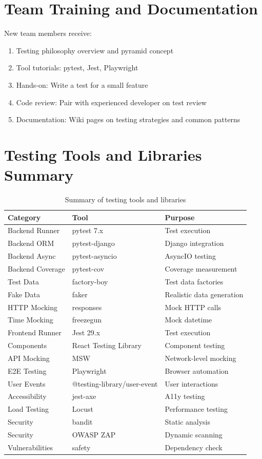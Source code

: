 \documentclass{report}
\begin{document}
\section{Team Training and Documentation}

New team members receive:

\begin{enumerate}
  \item Testing philosophy overview and pyramid concept
  \item Tool tutorials: pytest, Jest, Playwright
  \item Hands-on: Write a test for a small feature
  \item Code review: Pair with experienced developer on test review
  \item Documentation: Wiki pages on testing strategies and common patterns
\end{enumerate}

\section{Testing Tools and Libraries Summary}

\begin{table}[h]
\centering
\begin{tabular}{|l|l|l|}
\hline
\textbf{Category} & \textbf{Tool} & \textbf{Purpose} \\
\hline
Backend Runner & pytest 7.x & Test execution \\
\hline
Backend ORM & pytest-django & Django integration \\
\hline
Backend Async & pytest-asyncio & AsyncIO testing \\
\hline
Backend Coverage & pytest-cov & Coverage measurement \\
\hline
Test Data & factory-boy & Test data factories \\
\hline
Fake Data & faker & Realistic data generation \\
\hline
HTTP Mocking & responses & Mock HTTP calls \\
\hline
Time Mocking & freezegun & Mock datetime \\
\hline
Frontend Runner & Jest 29.x & Test execution \\
\hline
Components & React Testing Library & Component testing \\
\hline
API Mocking & MSW & Network-level mocking \\
\hline
E2E Testing & Playwright & Browser automation \\
\hline
User Events & @testing-library/user-event & User interactions \\
\hline
Accessibility & jest-axe & A11y testing \\
\hline
Load Testing & Locust & Performance testing \\
\hline
Security & bandit & Static analysis \\
\hline
Security & OWASP ZAP & Dynamic scanning \\
\hline
Vulnerabilities & safety & Dependency check \\
\hline
\end{tabular}
\caption{Summary of testing tools and libraries}
\end{table}
\end{document}
